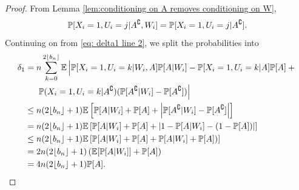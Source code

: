 \begin{proof}
		From Lemma \ref{lem:conditioning on A removes conditioning on W},
		\begin{equation}
			\mathbb{P}[X_i = 1, U_i = j | A^\complement, W_i] = \mathbb{P}[X_i = 1, U_i = j | A^\complement].
		\end{equation} 
		Continuing on from \eqref{eq: delta1 line 2}, we split the probabilities into
		\begin{align}
			\delta_1 &= n \sum_{k = 0}^{2 \lfloor b_n\rfloor} \mathbb{E} \left| \mathbb{P}[X_i = 1, U_i = k|W_i, A]\mathbb{P}[A|W_i] - \mathbb{P}[X_i = 1, U_i = k| A]\mathbb{P}[A] + \vphantom{A^\complement} \right.\\
			&\hphantom{= .} \left.\mathbb{P}(X_i = 1, U_i = k | A^\complement) (\mathbb{P}[A^\complement|W_i] - \mathbb{P}[A^\complement]) \right| \notag \\
			&\leq n (2\lfloor b_n\rfloor+1) \mathbb{E}\left[ \mathbb{P}[A|W_i] + \mathbb{P}[A] + \left|\mathbb{P}[A^\complement|W_i] - \mathbb{P}[A^\complement]\right|\right]\\
			&= n (2\lfloor b_n\rfloor + 1) \mathbb{E}\left[ \mathbb{P}[A|W_i] + \mathbb{P}[A] + \left|1 - \mathbb{P}[A|W_i] - (1 - \mathbb{P}[A])\right|\right]\\
			&\leq n (2\lfloor b_n\rfloor + 1) \mathbb{E}\left[ \mathbb{P}[A|W_i] + \mathbb{P}[A] + \mathbb{P}[A|W_i] + \mathbb{P}[A])\right]\\
			&= 2 n (2\lfloor b_n\rfloor + 1) \left(\mathbb{E}[\mathbb{P}[A|W_i]] + \mathbb{P}[A]\right)\\
			&= 4 n (2\lfloor b_n\rfloor + 1) \mathbb{P}[A].
		\end{align}


\end{proof}
